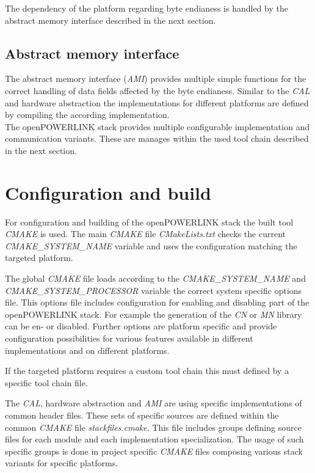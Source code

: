 The dependency of the platform regarding byte endianess is handled by the abstract memory interface described in the next section.

\subsection{Abstract memory interface}
\label{sec:oplk_architecture_ami}

The abstract memory interface (\emph{AMI}) provides multiple simple functions for the correct handling of data fields affected by the byte endianess.
Similar to the \emph{CAL} and hardware abstraction the implementations for different platforms are defined by compiling the according implementation. \cite[AMI]{openpowerlink_doc}
\\

The openPOWERLINK stack provides multiple configurable implementation and communication variants.
These are manages within the used tool chain described in the next section.

\section{Configuration and build}
\label{sec:oplk_build}
For configuration and building of the openPOWERLINK stack the built tool \emph{CMAKE} is used.
The main \emph{CMAKE} file \emph{CMakeLists.txt} checks the current \emph{CMAKE\_SYSTEM\_NAME} variable and uses the configuration matching the targeted platform.

The global \emph{CMAKE} file loads according to the \emph{CMAKE\_SYSTEM\_NAME} and \emph{CMAKE\_SYSTEM\_PROCESSOR} variable the correct system specific options file.
This options file includes configuration for enabling and disabling part of the openPOWERLINK stack.
For example the generation of the \emph{CN} or \emph{MN} library can be en- or disabled.
Further options are platform specific and provide configuration possibilities for various features available in different implementations and on different platforms.

If the targeted platform requires a custom tool chain this must defined by a specific tool chain file.

The \emph{CAL}, hardware abstraction and \emph{AMI} are using specific implementations of common header files.
These sets of specific sources are defined within the common \emph{CMAKE} file \emph{stackfiles.cmake}.
This file includes groups defining source files for each module and each implementation specialization.
The usage of such specific groups is done in project specific \emph{CMAKE} files composing various stack variants for specific platforms. \cite[Building openPOWERLINK]{openpowerlink_doc}

